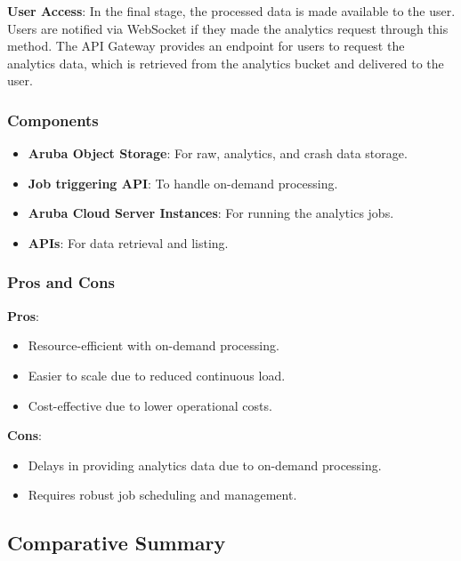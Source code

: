 \textbf{User Access}:  
In the final stage, the processed data is made available to the user. Users are notified via WebSocket if they made the analytics request through this method. The API Gateway provides an endpoint for users to request the analytics data, which is retrieved from the analytics bucket and delivered to the user.

\subsubsection{Components}
\begin{itemize}
    \item \textbf{Aruba Object Storage}: For raw, analytics, and crash data storage.
    \item \textbf{Job triggering API}: To handle on-demand processing.
    \item \textbf{Aruba Cloud Server Instances}: For running the analytics jobs.
    \item \textbf{APIs}: For data retrieval and listing.
\end{itemize}

\subsubsection{Pros and Cons}

\textbf{Pros}:
\begin{itemize}
    \item Resource-efficient with on-demand processing.
    \item Easier to scale due to reduced continuous load.
    \item Cost-effective due to lower operational costs.
\end{itemize}

\textbf{Cons}:
\begin{itemize}
    \item Delays in providing analytics data due to on-demand processing.
    \item Requires robust job scheduling and management.
\end{itemize}

\subsection{Comparative Summary}

